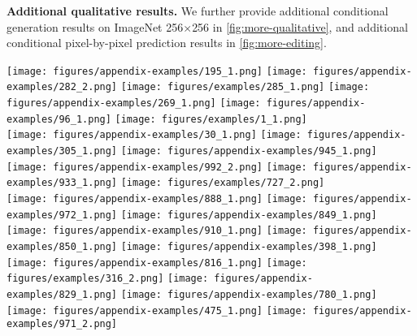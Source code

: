 \documentclass{article}
\renewcommand{\paragraph}[1]{\vspace{0.0em}\noindent\textbf{#1}}
\newcommand{\hhs}{\hspace{-0.001em}}
\newcommand{\vvs}{\vspace{-.1em}}
\begin{document}
\paragraph{Additional qualitative results.} We further provide additional conditional generation results on ImageNet 256$\times$256 in \autoref{fig:more-qualitative}, and additional conditional pixel-by-pixel prediction results in \autoref{fig:more-editing}.




\begin{figure*}[t]
\centering
    \texttt{[image: figures/appendix-examples/195\_1.png]}\hhs
    \texttt{[image: figures/appendix-examples/282\_2.png]}\hhs
    \texttt{[image: figures/examples/285\_1.png]}\hhs
    \texttt{[image: figures/appendix-examples/269\_1.png]}\hhs
    \texttt{[image: figures/appendix-examples/96\_1.png]}\hhs
    \texttt{[image: figures/examples/1\_1.png]}\vvs
    \\
    \texttt{[image: figures/appendix-examples/30\_1.png]}\hhs
    \texttt{[image: figures/appendix-examples/305\_1.png]}\hhs
    \texttt{[image: figures/appendix-examples/945\_1.png]}\hhs
    \texttt{[image: figures/appendix-examples/992\_2.png]}\hhs
    \texttt{[image: figures/appendix-examples/933\_1.png]}\hhs
    \texttt{[image: figures/examples/727\_2.png]}\vvs
    \\
    \texttt{[image: figures/appendix-examples/888\_1.png]}\hhs
    \texttt{[image: figures/appendix-examples/972\_1.png]}\hhs
    \texttt{[image: figures/appendix-examples/849\_1.png]}\hhs
    \texttt{[image: figures/appendix-examples/910\_1.png]}\hhs
    \texttt{[image: figures/appendix-examples/850\_1.png]}\hhs
    \texttt{[image: figures/appendix-examples/398\_1.png]}\vvs
    \\
    \texttt{[image: figures/appendix-examples/816\_1.png]}\hhs
    \texttt{[image: figures/examples/316\_2.png]}\hhs
    \texttt{[image: figures/appendix-examples/829\_1.png]}\hhs
    \texttt{[image: figures/appendix-examples/780\_1.png]}\hhs
    \texttt{[image: figures/appendix-examples/475\_1.png]}\hhs
    \texttt{[image: figures/appendix-examples/971\_2.png]}\vvs
    \label{fig:more-qualitative}
\end{figure*}
\end{document}
